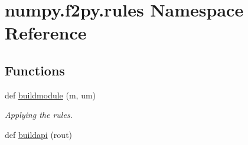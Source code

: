 \hypertarget{namespacenumpy_1_1f2py_1_1rules}{}\section{numpy.\+f2py.\+rules Namespace Reference}
\label{namespacenumpy_1_1f2py_1_1rules}
\subsection*{Functions}
\begin{DoxyCompactItemize}
\item 
def \hyperlink{namespacenumpy_1_1f2py_1_1rules_a98429075834911d2ae9726fc30420a92}{buildmodule} (m, um)
\begin{DoxyCompactList}\small\item\em Applying the rules. \end{DoxyCompactList}\item 
def \hyperlink{namespacenumpy_1_1f2py_1_1rules_a35634bf0571e3a8ffd2dde6413a8644b}{buildapi} (rout)
\end{DoxyCompactItemize}
